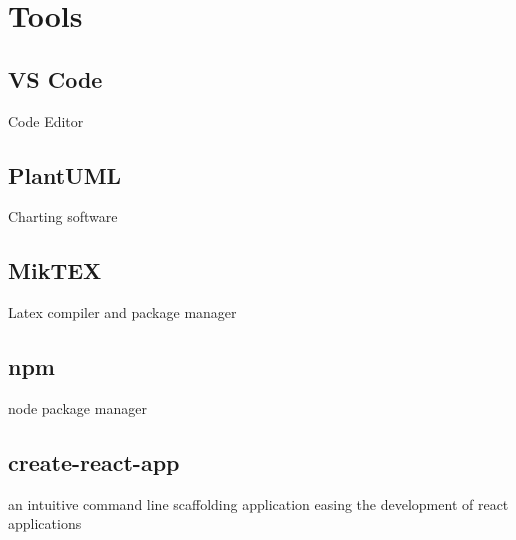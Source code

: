 \section{Tools}
\subsection{VS Code}
Code Editor
\subsection{PlantUML}
Charting software
\subsection{MikTEX}
Latex compiler and package manager
\subsection{npm}
node package manager
\subsection{create-react-app}
an intuitive command line scaffolding application easing the development of react applications